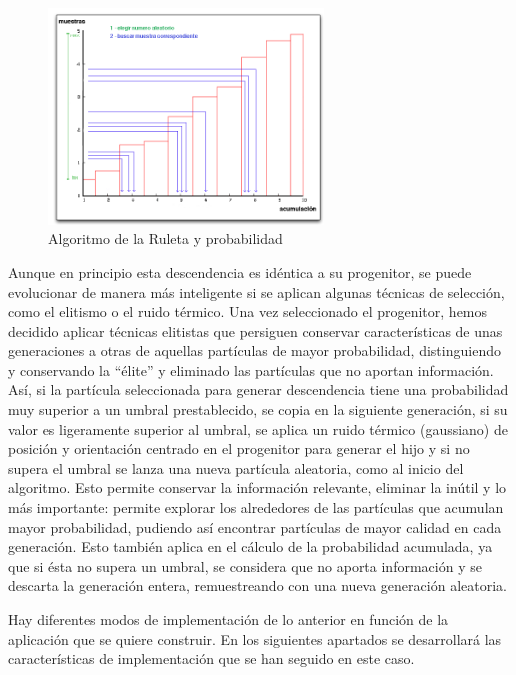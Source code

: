 \begin{figure}[H]
\begin{center}
	\includegraphics[width=0.65\textwidth]{figures/pacruleta.png}
	\caption{Algoritmo de la Ruleta y probabilidad}
	\label{fig.pacruleta}
	\end{center}
\end{figure}

Aunque en principio esta descendencia es idéntica a su progenitor, se puede evolucionar de manera más inteligente si se aplican algunas técnicas de selección, como el elitismo o el ruido térmico. Una vez seleccionado el progenitor, hemos decidido aplicar técnicas elitistas que persiguen conservar características de unas generaciones a otras de aquellas partículas de mayor probabilidad, distinguiendo y conservando la “élite” y eliminado las partículas que no aportan información. Así, si la partícula seleccionada para generar descendencia tiene una probabilidad muy superior a un umbral prestablecido, se copia en la siguiente generación, si su valor es ligeramente superior al umbral, se aplica un ruido térmico (gaussiano) de posición y orientación centrado en el progenitor para generar el hijo y si no supera el umbral se lanza una nueva partícula aleatoria, como al inicio del algoritmo. Esto permite conservar la información relevante, eliminar la inútil y lo más importante: permite explorar los alrededores de las partículas que acumulan mayor probabilidad, pudiendo así encontrar partículas de mayor calidad en cada generación. Esto también aplica en el cálculo de la probabilidad acumulada, ya que si ésta no supera un umbral, se considera que no aporta información y se descarta la generación entera, remuestreando con una nueva generación aleatoria.

Hay diferentes modos de implementación de lo anterior en función de la aplicación que se quiere construir. En los siguientes apartados se desarrollará las características de implementación que se han seguido en este caso.


